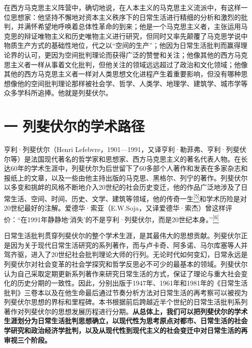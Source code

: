 \documentclass[UTF8, fontset = sourcesans, a4paper, oneside, zihao =
-4, scheme=chinese, no-math, space=true]{ctexbook}
\begin{document}
在西方马克思主义阵营中，确切地说，在人本主义的马克思主义流派中，有这样一位思想家：他坚持不懈地对资本主义秩序下的日常生活进行精细的分析和激烈的批判，并满怀希望地呼唤着总体性革命的到来；他是一个马克思主义者，主张运用马克思的辩证唯物主义和历史唯物主义进行研究，但同时又率先颠覆了马克思学说中物质生产方式的基础性地位，代之以``空间的生产''；他因为日常生活批判而赢得理论界的认可，更因为空间批判理论而获得广泛的赞誉和关注；他像其他的西方马克思主义者一样从事着文化批判，但他关注的领域远远超过了政治和文化领域；他像其他的西方马克思主义者一样对人类思想文化进程产生着重要影响，但没有哪种思想像他的空间批判理论那样被社会学、哲学、人类学、地理学、建筑学、城市学等众多学科所追捧。他就是列斐伏尔。

\section{一 列斐伏尔的学术路径}\label{part0004.htmlux5cux23c001}

亨利·列斐伏尔（Henri
Lefebvre，1901---1991，又译亨利·勒菲弗、亨利·列斐伏尔等）是法国现代著名的哲学家和思想家、西方马克思主义的著名代表人物。在长达60年的学术生涯中，列斐伏尔为后世留下了60多部个人著作和发表在多家杂志和报纸上的文章，以及一些由他主持出版的马克思、黑格尔、列宁的著作。列斐伏尔以多变和挑衅的风格不断地介入20世纪的社会历史变迁，他的作品广泛地涉及了日常生活、空间、时间、历史、文学、建筑等领域，他的传奇一生\protect\hypertarget{part0004.htmlux5cux23w5}{}{}\protect\hyperlink{part0004.htmlux5cux23m5}{\textsuperscript{{[}5{]}}}和学术历险是对20世纪最好的注解。爱德华·索亚（E.W.Soja，又译爱德华·索杰）曾这样评价：``在1991年静静地`消失'的不是亨利·列斐伏尔，而是20世纪本身。''\protect\hypertarget{part0004.htmlux5cux23w6}{}{}\protect\hyperlink{part0004.htmlux5cux23m6}{\textsuperscript{{[}6{]}}}

日常生活批判贯穿列斐伏尔的整个学术生涯，是其最伟大的思想贡献。列斐伏尔正是因为关于现代日常生活研究的系列著作，而与卢卡奇、阿多诺、马尔库塞等人并驾齐驱，进入了20世纪社会批判理论大师的行列。无论时代如何变幻，日常永远是列斐伏尔对社会变革的社会学探究和哲学反思必不可少的最基本的领域。列斐伏尔认为自己采取定期更新系列著作来研究日常生活的方式，保证了理论与重大社会变化的历史分期的一致性。因此，分别出版于1947年、1961年和1981年的《日常生活批判》三卷本以及在他生命最后通过节奏分析方法对日常生活的再考察可以被视为列斐伏尔思想的界标和里程碑。本书根据前后跨越近半个世纪的日常生活批判系列著作对列斐伏尔的思想发展历程进行分期。\textbf{从总体上，我们可以把列斐伏尔的学术生涯划分为日常生活批判思想确立，以现代性为思考原点对都市、日常生活的社会学研究和政治经济学批判，以及从现代性到现代主义的社会变迁中对日常生活的再审视三个阶段。}
\end{document}

